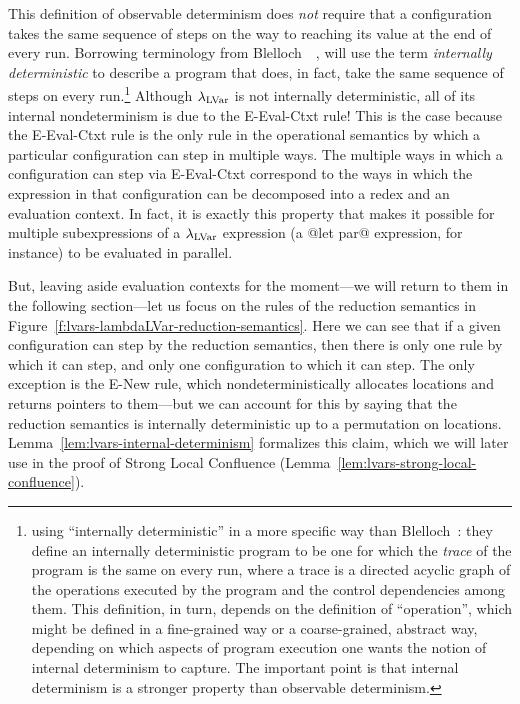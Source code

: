 This definition of observable determinism does \emph{not} require that
a configuration takes the same sequence of steps on the way to
reaching its value at the end of every run.
Borrowing terminology from
Blelloch~\etal~,  will use
the term \emph{internally deterministic} to describe a program that
does, in fact, take the same sequence of steps on every
run.\footnote{ using ``internally deterministic'' in a more
  specific way than Blelloch~\etal: they define an internally
  deterministic program to be one for which the \emph{trace} of the
  program is the same on every run, where a trace is a directed
  acyclic graph of the operations executed by the program and the
  control dependencies among them.  This definition, in turn, depends
  on the definition of ``operation'', which might be defined in a
  fine-grained way or a coarse-grained, abstract way, depending on
  which aspects of program execution one wants the notion of internal
  determinism to capture.  The important point is that internal
  determinism is a stronger property than observable determinism.}
Although $\lambda_{\textrm{LVar}}$ is not internally deterministic, all of its
internal nondeterminism is due to the {\sc E-Eval-Ctxt} rule!  This is
the case because the {\sc E-Eval-Ctxt} rule is the only rule in the
operational semantics by which a particular configuration can step in
multiple ways.  The multiple ways in which a configuration can step
via {\sc E-Eval-Ctxt} correspond to the ways in which the expression
in that configuration can be decomposed into a redex and an evaluation
context.  In fact, it is exactly this property that makes it possible
for multiple subexpressions of a $\lambda_{\textrm{LVar}}$ expression (a @let par@
expression, for instance) to be evaluated in parallel.

But, leaving aside evaluation contexts for the moment---we will return to them in the following section---let us focus on the rules of the reduction semantics in
Figure~\ref{f:lvars-lambdaLVar-reduction-semantics}.  Here we can see that if a
given configuration can step by the reduction semantics, then there is
only one rule by which it can step, and only one configuration to
which it can step.  The only exception is the {\sc E-New} rule, which
nondeterministically allocates locations and returns pointers to
them---but we can account for this by saying that the reduction
semantics is internally deterministic up to a permutation on
locations.  Lemma~\ref{lem:lvars-internal-determinism} formalizes this
claim, which we will later use in the proof of Strong Local Confluence
(Lemma~\ref{lem:lvars-strong-local-confluence}).

